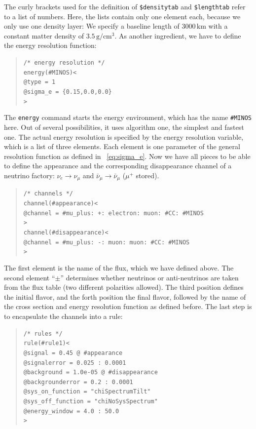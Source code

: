 The curly brackets used for the definition of {\tt \$densitytab} and
{\tt \$lengthtab} refer to a list of numbers. Here, the lists contain only
one element each, because we only use one density layer: We specify a
baseline length of $3000 \, \mathrm{km}$ with a constant matter density of
$3.5 \, \mathrm{g/cm^3}$. 
%
As another ingredient, we have to define the energy resolution function:
\begin{quote}
{\tt /* energy resolution */}\\
{\tt energy(\#MINOS)<}\\
{\tt \tb @type = 1}\\
{\tt \tb @sigma\_e = \{0.15,0.0,0.0\}}\\
{\tt >}
\end{quote}
The {\tt energy} command starts the energy environment, which has the name 
{\tt \#MINOS} here. Out of several possibilities, it uses algorithm one,
the simplest and fastest one. The actual energy resolution is specified
by the energy resolution variable, which is a list of three elements. Each 
element is one parameter of the general resolution function as defined in 
\eq~\ref{eq:sigma_e}.
%
Now we have all pieces to be able to define the appearance and the corresponding disappearance channel of a neutrino factory: 
$\nu_e\rightarrow\nu_\mu$  and $\bar\nu_\mu\rightarrow\bar\nu_\mu$ 
($\mu^+$ stored).
\begin{quote}
{\tt /* channels */}\\
{\tt channel(\#appearance)<}\\
{\tt \tb @channel = \#mu\_plus: +: electron: muon: \#CC: \#MINOS}\\
{\tt >}\\
{\tt channel(\#disappearance)<}\\
{\tt \tb @channel = \#mu\_plus: -: muon: muon: \#CC: \#MINOS}\\
{\tt >}
\end{quote}
The first element is the name of the flux, which we have defined above. 
The second element ``$\pm$'' determines whether 
neutrinos or anti-neutrinos are taken from the flux table (two different polarities allowed). The third position defines the initial flavor,
and the forth position the final flavor, followed by the name of the cross
section and energy resolution function as defined before.
%
The last step is to encapsulate the channels into a rule:
\begin{quote}
{\tt /* rules */}\\
{\tt rule(\#rule1)<}\\
{\tt \tb @signal = 0.45 @ \#appearance}\\
{\tt \tb @signalerror = 0.025 : 0.0001}\\
{\tt \tb @background = 1.0e-05 @ \#disappearance}\\
{\tt \tb @backgrounderror = 0.2 : 0.0001}\\
{\tt \tb @sys\_on\_function = "chiSpectrumTilt"}\\
{\tt \tb @sys\_off\_function = "chiNoSysSpectrum"}\\
{\tt \tb @energy\_window = 4.0 : 50.0}\\
{\tt >}
\end{quote}
